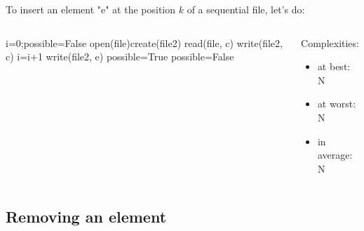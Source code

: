 \documentclass{beamer}[10pt, usepdftitle=false, handout]
\begin{document}
	\begin{frame}
	
	To insert an element "e" at the position $k$ of a sequential file, let's do:
	
	\begin{columns}[c]
	\begin{center}    
    \scalebox{0.75} {
    \begin{algorithm}[H]
    i=0;possible=False\;
    open(file)\;create(file2)\;
	 {
		read(file, c)\;
		write(file2, c)\;
		i=i+1\; 
	}
	 {
		write(file2, e)\;
		possible=True\;
	} {
		possible=False\;
	}
	\end{algorithm}	
	}
	\end{center}	 
	\begin{center}
	Complexities: 
	\begin{itemize}
		\item {at best: N}
		\item {at worst: N}
		\item {in average: N}
	\end{itemize}		
	\end{center}
	\end{columns}
	
	\end{frame}	
	
	\subsection{Removing an element}
	
\end{document}
